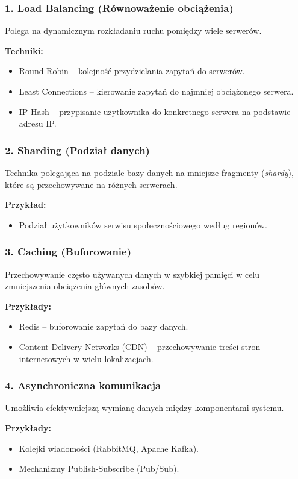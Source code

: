 \subsubsection{1. Load Balancing (Równoważenie obciążenia)}
Polega na dynamicznym rozkładaniu ruchu pomiędzy wiele serwerów.

\textbf{Techniki:}
\begin{itemize}
    \item Round Robin – kolejność przydzielania zapytań do serwerów.
    \item Least Connections – kierowanie zapytań do najmniej obciążonego serwera.
    \item IP Hash – przypisanie użytkownika do konkretnego serwera na podstawie adresu IP.
\end{itemize}

\subsubsection{2. Sharding (Podział danych)}
Technika polegająca na podziale bazy danych na mniejsze fragmenty (\textit{shardy}), które są przechowywane na różnych serwerach.

\textbf{Przykład:}
\begin{itemize}
    \item Podział użytkowników serwisu społecznościowego według regionów.
\end{itemize}

\subsubsection{3. Caching (Buforowanie)}
Przechowywanie często używanych danych w szybkiej pamięci w celu zmniejszenia obciążenia głównych zasobów.

\textbf{Przykłady:}
\begin{itemize}
    \item Redis – buforowanie zapytań do bazy danych.
    \item Content Delivery Networks (CDN) – przechowywanie treści stron internetowych w wielu lokalizacjach.
\end{itemize}

\subsubsection{4. Asynchroniczna komunikacja}
Umożliwia efektywniejszą wymianę danych między komponentami systemu.

\textbf{Przykłady:}
\begin{itemize}
    \item Kolejki wiadomości (RabbitMQ, Apache Kafka).
    \item Mechanizmy Publish-Subscribe (Pub/Sub).
\end{itemize}

